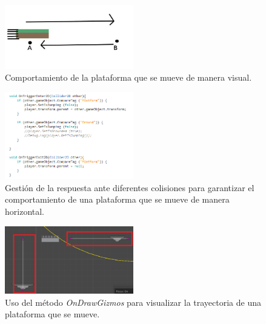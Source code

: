 \begin{itemize}
            \begin{figure}[h]
                \centering
                \includegraphics[width=0.5\textwidth]{03TrabajoRealizado/imagenes/plataformaMovil.jpg}
                \caption{Comportamiento de la plataforma que se mueve de manera visual.}
                \label{fig:MovingPlatform}
            \end{figure}
            
            \begin{figure}[h]
                \centering
                \includegraphics[width=0.5\textwidth]{03TrabajoRealizado/imagenes/plataformaColisiones.png}
                \caption{Gestión de la respuesta ante diferentes colisiones para
                garantizar el comportamiento de una plataforma que se mueve de manera
                horizontal.}
                \label{fig:MovingPlatformCol}
            \end{figure}
            
            \begin{figure}[h]
                \centering
                \includegraphics[width=0.5\textwidth]{03TrabajoRealizado/imagenes/plataformaConfig.png}
                \caption{Uso del método \textit{OnDrawGizmos} para visualizar la
                trayectoria de una plataforma que se mueve.}
                \label{fig:MovingPlatformWay}
            \end{figure}


\end{itemize}
